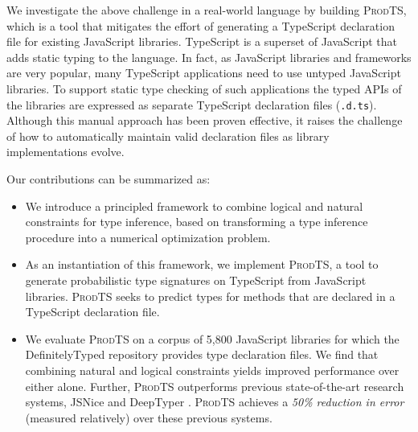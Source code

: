 \documentclass[sigplan,10pt,anonymous]{acmart} %
\newcommand{\prodts}{\textsc{ProdTS}\xspace}
\theoremstyle{plain}
\theoremstyle{remark}
\theoremstyle{definition}
\begin{document}
We investigate the above challenge in a real-world language by building \prodts,
which is a tool that mitigates the effort of generating a
TypeScript declaration file for existing JavaScript libraries.
TypeScript is a superset of JavaScript that adds static typing to the language.
In fact, as JavaScript libraries and frameworks are very popular, many
TypeScript applications need to use untyped JavaScript libraries.
To support static type
checking of such applications the typed
APIs of the libraries are expressed as separate TypeScript
declaration files (\lstinline{.d.ts}).  Although this manual approach has been proven
effective, it raises the challenge of how to automatically maintain valid declaration files
as library implementations evolve.

Our contributions can be summarized as:
\begin{itemize}[label=\raisebox{0.25ex}{\tiny$\bullet$}]
  \item We introduce a principled framework to combine logical and natural constraints for type inference,
        based on transforming a type inference procedure into a numerical optimization problem.
  \item As an instantiation of this framework, we implement \prodts, a tool to generate probabilistic type
        signatures on TypeScript from JavaScript libraries.
        \prodts seeks to predict types for methods that are declared in a TypeScript declaration file.
  \item We evaluate \prodts on a corpus of 5,800 JavaScript libraries for which
        the DefinitelyTyped repository provides type declaration files.
        We find that combining natural and logical constraints
        yields improved performance over either alone.
        Further, \prodts outperforms previous state-of-the-art research systems,
        JSNice \cite{raychev15} and DeepTyper \cite{hellendoorn18}.
        \prodts achieves a \emph{50\% reduction in error} (measured relatively) over these previous systems.
\end{itemize}
\end{document}
